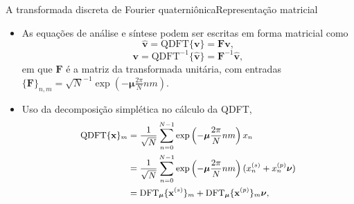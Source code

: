 \documentclass[10pt,compress]{beamer}
\newcommand{\qmu}{\boldsymbol{\mu}}
\newcommand{\qnu}{\boldsymbol{\nu}}
\begin{document}
\begin{frame}{A transformada discreta de Fourier quaterni\^onica}{Representa\c c\~ao matricial}
\begin{itemize}
\item As equa\c c\~oes de an\'alise e s\'intese podem ser escritas em forma matricial como
\begin{equation}
\label{eq:QDFT}
\widehat{\mathbf{v}} = \text{QDFT}\{ \mathbf{v} \} = \mathbf{F} \mathbf{v},
\end{equation}
\begin{equation}
\label{eq:QDFT_mtx_inv}
\mathbf{v} = \text{QDFT}^{-1}\{ \widehat{\mathbf{v}} \} = \mathbf{F}^{-1} \widehat{\mathbf{v}},
\end{equation}
em que $ \mathbf{F} $ \'e a matriz da transformada unit\'aria,
com entradas $ \{\mathbf{F}\}_{n,m} = \sqrt{N}^{-1} \exp \left( -\qmu \frac{2\pi}{N} nm \right)$.
\item Uso da decomposi\c c\~ao simpl\'etica no c\'alculo da QDFT,
\begin{equation}
\small
\begin{aligned}
\text{QDFT}\{ \mathbf{x} \}_m &= \frac{1}{\sqrt{N}} \sum_{n=0}^{N-1} \exp \left( -\qmu \frac{2\pi}{N} nm \right) x_n \\
&= \frac{1}{\sqrt{N}} \sum_{n=0}^{N-1} \exp \left( -\qmu \frac{2\pi}{N} nm \right) (x_n^{(s)} + x_n^{(p)}\qnu) \\
&= \text{DFT}_{\qmu}\{ \mathbf{x}^{(s)} \}_m +
\text{DFT}_{\qmu}\{ \mathbf{x}^{(p)} \}_m \qnu,
\end{aligned}
\end{equation}
\end{itemize}
\end{frame}
\end{document}
